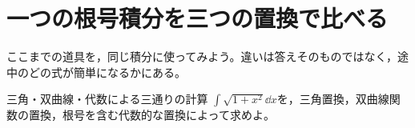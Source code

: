 \section{一つの根号積分を三つの置換で比べる}\label{節:根号積分の三方法}

ここまでの道具を，同じ積分に使ってみよう。違いは答えそのものではなく，途中のどの式が簡単になるかにある。

\begin{example}{三角・双曲線・代数による三通りの計算}
$\int\sqrt{1+x^2}\dd x$を，三角置換，双曲線関数の置換，根号を含む代数的な置換によって求めよ。
\end{example}

%
%
%
